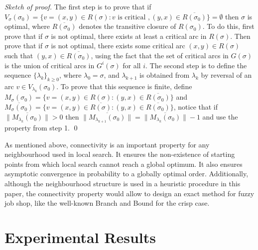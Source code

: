 \documentclass[letterpaper]{article}
\begin{document}
\emph{Sketch of proof.} The first step is to prove that if $V_\sigma(\sigma_0) = \{v=(x,y) \in R(\sigma) : v \text{ is critical }, (y,x) \in \overline{R(\sigma_0)} \} = \emptyset$ then $\sigma$ is optimal, where $\overline{R(\sigma_0)}$ denotes the transitive closure of $R(\sigma_0)$. To do this, first prove that if $\sigma$ is not optimal, there exists at least a critical arc in $R(\sigma)$. Then prove that if $\sigma$ is not optimal, there exists some critical arc $(x,y) \in R(\sigma)$ such that $(y,x) \in \overline{R(\sigma_0)}$, using the fact that the set of critical arcs in $G(\sigma)$ is the union of critical arcs in $G^i(\sigma)$ for all $i$. The second step is to define the sequence $\{\lambda_k\}_{k \geq 0}$, where $\lambda_0 = \sigma$, and $\lambda_{k+1}$ is obtained from $\lambda_k$ by reversal of an arc $v \in V_{\lambda_k}(\sigma_0)$. To prove that this sequence is finite, define $M_{\sigma}(\sigma_0) = \{v=(x,y) \in R(\sigma) : (y,x) \in \overline{R(\sigma_0)} \}$ and $\overline{M_{\sigma}(\sigma_0)} = \{v=(x,y) \in \overline{R(\sigma)} : (y,x) \in \overline{R(\sigma_0)} \}$, notice that if $\|\overline{M_{\lambda_k}(\sigma_0)}\| > 0$ then $\|\overline{M_{\lambda_{k+1}}(\sigma_0)}\| = \|\overline{M_{\lambda_k}(\sigma_0)}\| -1$ and use the property from step 1. \qed

As mentioned above, connectivity is an important property for any neighbourhood used in local search. It ensures the non-existence of starting points from which local search cannot reach a global optimum. It also ensures asymptotic convergence in probability to a globally optimal order. Additionally, although the neighbourhood structure is used in a heuristic procedure in this paper, the connectivity property would allow to design an exact method for fuzzy job shop, like the well-known Branch and Bound for the crisp case.

%
\section{Experimental Results}\label{secExperimentalResults}
\end{document}
